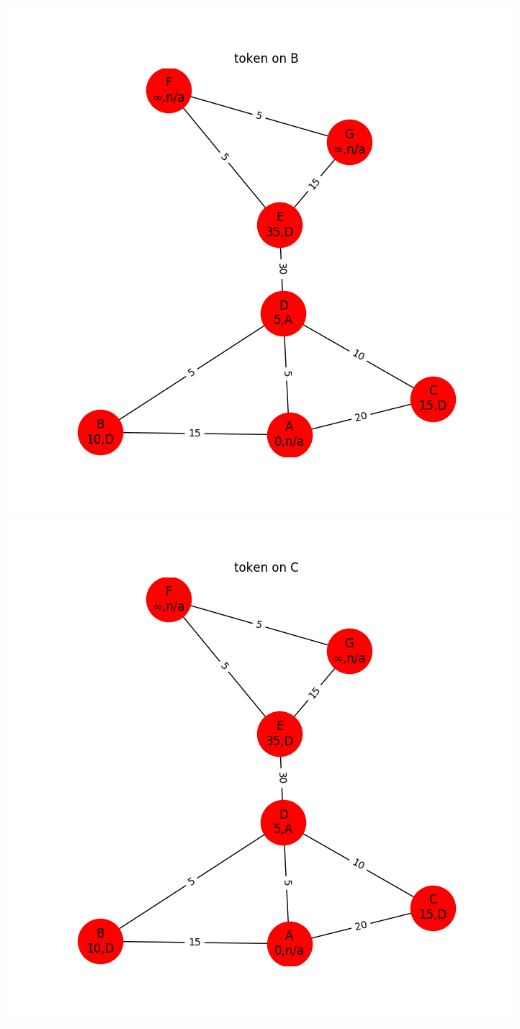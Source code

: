 \documentclass{article}
\begin{document}
\begin{enumerate}
\begin{enumerate}
    \includegraphics[width=\textwidth,height=\textheight,keepaspectratio]{4a3}
    \includegraphics[width=\textwidth,height=\textheight,keepaspectratio]{4a4}

\end{enumerate}
\end{enumerate}
\end{document}
